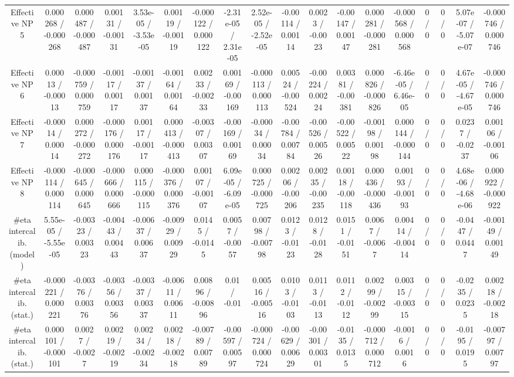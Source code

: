 \documentclass[10pt]{article}
\begin{document}
\begin{table}[htbp]
\begin{center}
\begin{tabular}{|c|c|c|c|c|c|c|c|c|c|c|c|c|c|c|c|c|c|}
  Effective NP 5 & 0.000268 / -0.000268 & 0.000487 / -0.000487 & 0.00131 / -0.00131 & 3.53e-05 / -3.53e-05 & 0.00119 / -0.00119 & -0.000122 / 0.000122 & -2.31e-05 / 2.31e-05 & 2.52e-05 / -2.52e-05 & -0.00114 / 0.00114 & 0.0023 / -0.0023 & -0.00147 / 0.00147 & 0.000281 / -0.000281 & -0.000568 / 0.000568 & 0 / 0 & 0 / 0 & 5.07e-07 / -5.07e-07 & -0.000746 / 0.000746 \\ 
  Effective NP 6 & 0.00013 / -0.00013 & -0.000759 / 0.000759 & -0.00117 / 0.00117 & -0.00137 / 0.00137 & -0.00164 / 0.00164 & 0.00233 / -0.00233 & 0.00169 / -0.00169 & -0.000113 / 0.000113 & 0.00524 / -0.00524 & -0.00224 / 0.00224 & 0.00381 / -0.00381 & 0.000826 / -0.000826 & -6.46e-05 / 6.46e-05 & 0 / 0 & 0 / 0 & 4.67e-05 / -4.67e-05 & -0.000746 / 0.000746 \\ 
  Effective NP 7 & -0.00014 / 0.00014 & 0.000272 / -0.000272 & -0.000176 / 0.000176 & 0.00117 / -0.00117 & 0.000413 / -0.000413 & -0.00307 / 0.00307 & -0.00169 / 0.00169 & -0.00034 / 0.00034 & -0.00784 / 0.00784 & -0.00526 / 0.00526 & -0.00522 / 0.00522 & -0.00198 / 0.00198 & 0.000144 / -0.000144 & 0 / 0 & 0 / 0 & 0.0237 / -0.0237 & 0.00106 / -0.00106 \\ 
  Effective NP 8 & -0.000114 / 0.000114 & -0.000645 / 0.000645 & -0.000666 / 0.000666 & 0.000115 / -0.000115 & -0.000376 / 0.000376 & 0.00107 / -0.00107 & 6.09e-05 / -6.09e-05 & 0.000725 / -0.000725 & 0.00206 / -0.00206 & 0.00235 / -0.00235 & 0.00118 / -0.00118 & 0.000436 / -0.000436 & 0.00193 / -0.00193 & 0 / 0 & 0 / 0 & 4.68e-06 / -4.68e-06 & 0.000922 / -0.000922 \\ 
  #eta intercalib. (model) & 5.55e-05 / -5.55e-05 & -0.00323 / 0.00323 & -0.00443 / 0.00443 & -0.00637 / 0.00637 & -0.00929 / 0.00929 & 0.0145 / -0.0145 & 0.0057 / -0.0057 & 0.00798 / -0.00798 & 0.0123 / -0.0123 & 0.0128 / -0.0128 & 0.0151 / -0.0151 & 0.0067 / -0.0067 & 0.00414 / -0.00414 & 0 / 0 & 0 / 0 & -0.0447 / 0.0447 & -0.00149 / 0.00149 \\ 
  #eta intercalib. (stat.) & -0.000221 / 0.000221 & -0.00376 / 0.00376 & -0.00356 / 0.00356 & -0.00337 / 0.00337 & -0.00611 / 0.00611 & 0.00896 / -0.00896 & 0.01 / -0.01 & 0.00516 / -0.00516 & 0.0103 / -0.0103 & 0.0113 / -0.0113 & 0.0112 / -0.0112 & 0.00299 / -0.00299 & 0.00315 / -0.00315 & 0 / 0 & 0 / 0 & -0.0235 / 0.0235 & 0.00218 / -0.00218 \\ 
  #eta intercalib. (stat.) & 0.000101 / -0.000101 & 0.0027 / -0.0027 & 0.00219 / -0.00219 & 0.00234 / -0.00234 & 0.00218 / -0.00218 & -0.00789 / 0.00789 & -0.00597 / 0.00597 & -0.000724 / 0.000724 & -0.00629 / 0.00629 & -0.00301 / 0.00301 & -0.0135 / 0.0135 & -0.000712 / 0.000712 & -0.0016 / 0.0016 & 0 / 0 & 0 / 0 & -0.0195 / 0.0195 & -0.00797 / 0.00797 \\ 

\end{tabular}
\end{center}
\end{table}
\end{document}
